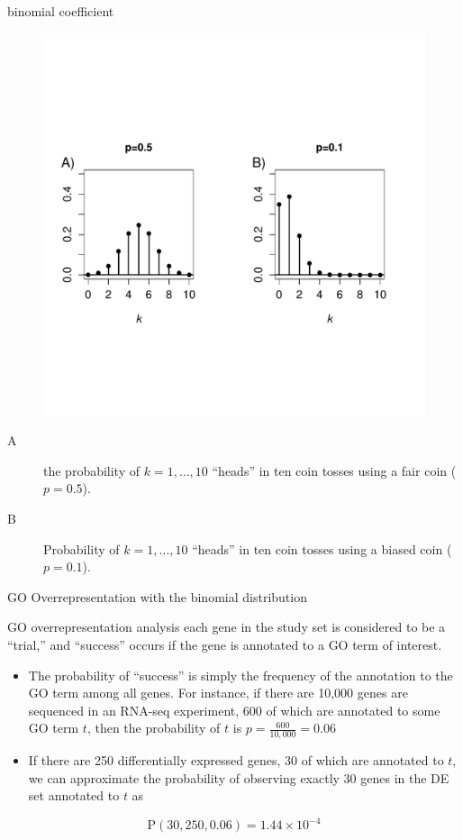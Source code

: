 \documentclass{beamer}
\begin{document}
\begin{frame}{binomial coefficient}


\begin{figure}[h!]
 \centering
 \includegraphics[width=.8\textwidth,viewport= 0 100 500 
380,clip]{img/binomial.pdf}
 \label{fig:binomial}
\end{figure}
\begin{description}
\item[A]the probability of
   $k=1,\ldots,10$ ``heads'' in ten coin tosses using a fair coin
   ($p=0.5$). 
   \item[B]Probability of $k=1,\ldots,10$ ``heads''
   in ten coin tosses using a biased coin ($p=0.1$).
\end{description} 
 
 

\end{frame}
\begin{frame}{GO Overrepresentation with the binomial distribution}
 \begin{mybluebox}{GO overrepresentation analysis}
each gene in the study set
is considered to be a ``trial,''  and ``success'' occurs if the gene is
annotated to a GO term of interest.
\end{mybluebox}
\begin{itemize}
\item The probability of ``success'' is simply the
frequency of the annotation to the GO term among all genes.  For
instance, if there are 10,000 genes are sequenced in an RNA-seq experiment, 600 of which
are annotated to some GO term $t$, then the probability of $t$ is
 $p=\frac{600}{10,000}=0.06$
\item If there are 250 differentially expressed genes, 30 of which are annotated to $t$, we can approximate the probability of observing exactly 30 genes in
the DE set annotated to $t$ as
\end{itemize}
\begin{equation}
\mathrm{P}(30,250,0.06)=1.44\times 10^{-4}
\end{equation}

 
\end{frame}
\end{document}
